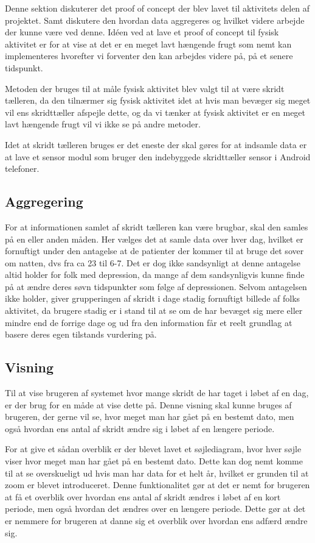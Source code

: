 Denne sektion diskuterer det proof of concept der blev lavet til aktivitets delen af projektet. Samt diskutere den hvordan data aggregeres og hvilket videre arbejde der kunne være ved denne. 
Idéen ved at lave et proof of concept til fysisk aktivitet er for at vise at det er en meget lavt hængende frugt som nemt kan implementeres hvorefter vi forventer den kan arbejdes videre på, på et senere tidspunkt.

Metoden der bruges til at måle fysisk aktivitet blev valgt til at være skridt tælleren, da den tilnærmer sig fysisk aktivitet idet at hvis man bevæger sig meget vil ens skridttæller afspejle dette, og da vi tænker at fysisk aktivitet er en meget lavt hængende frugt vil vi ikke se på andre metoder.

Idet at skridt tælleren bruges er det eneste der skal gøres for at indsamle data er at lave et sensor modul som bruger den indebyggede skridttæller sensor i Android telefoner. 

\subsection{Aggregering}
For at informationen samlet af skridt tælleren kan være brugbar, skal den samles på en eller anden måden.
Her vælges det at samle data over hver dag, hvilket er fornuftigt under den antagelse at de patienter der kommer til at bruge det sover om natten, dvs fra ca 23 til 6-7.
Det er dog ikke sandsynligt at denne antagelse altid holder for folk med depression, da mange af dem sandsynligvis kunne finde på at ændre deres søvn tidspunkter som følge af depressionen.
Selvom antagelsen ikke holder, giver grupperingen af skridt i dage stadig fornuftigt billede af folks aktivitet, da brugere stadig er i stand til at se om de har bevæget sig mere eller mindre end de forrige dage og ud fra den information får et reelt grundlag at basere deres egen tilstands vurdering på.

\subsection{Visning}
Til at vise brugeren af systemet hvor mange skridt de har taget i løbet af en dag, er der brug for en måde at vise dette på.
Denne visning skal kunne bruges af brugeren, der gerne vil se, hvor meget man har gået på en bestemt dato, men også hvordan ens antal af skridt ændre sig i løbet af en længere periode.

For at give et sådan overblik er der blevet lavet et søjlediagram, hvor hver søjle viser hvor meget man har gået på en bestemt dato.
Dette kan dog nemt komme til at se overskueligt ud hvis man har data for et helt år, hvilket er grunden til at zoom er blevet introduceret.
Denne funktionalitet gør at det er nemt for brugeren at få et overblik over hvordan ens antal af skridt ændres i løbet af en kort periode, men også hvordan det ændres over en længere periode.
Dette gør at det er nemmere for brugeren at danne sig et overblik over hvordan ens adfærd ændre sig.